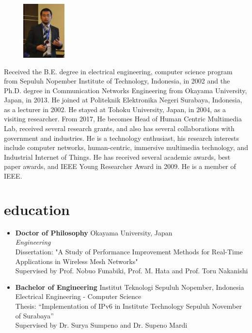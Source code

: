 \documentclass[]{friggeri-cv} %
\renewenvironment{entrylist}{%
  \begin{itemize}[leftmargin=1in]%
}{%
  \end{itemize}
}
\renewcommand{\entry}[4]{%
  \item[#1]
    \textbf{#2}%
    \hfill%
    {\footnotesize\addfontfeature{Color=lightgray} #3}\\%
    #4\vspace{\parsep}%
  }
\begin{document}
\begin{figure}
	\vspace{-10pt}
	\begin{center}
    \includegraphics[width=0.2\textwidth]{dhoto-jas.jpg}
    \end{center}
    
\end{figure}
Received the B.E. degree in electrical engineering, computer science program from Sepuluh Nopember Institute of Technology, Indonesia, in 2002 and the Ph.D. degree in Communication Networks Engineering from Okayama University, Japan, in 2013. He joined at Politeknik Elektronika Negeri Surabaya, Indonesia, as a lecturer in 2002. He stayed at Tohoku University, Japan, in 2004, as a visiting researcher. From 2017, He becomes Head of Human Centric Multimedia Lab, received several research grants, and also has several collaborations with government and industries. He is a technology enthusiast, his research interests include computer networks, human-centric, immersive multimedia technology, and Industrial Internet of Things. He has received several academic awards, best paper awards, and IEEE Young Researcher Award in 2009. He is a member of IEEE.



\section{education}

\begin{entrylist}

\entry
{2009--2013}
{Doctor {\normalfont of Philosophy}}
{Okayama University, Japan}
{\emph{Engineering} \\ 
Dissertation: "A Study of Performance Improvement Methods for Real-Time Applications in Wireless Mesh Networks" \\
Supervised by Prof. Nobuo Funabiki, Prof. M. Hata and Prof. Toru Nakanishi}

\entry
{1997--2002}
{Bachelor {\normalfont of Engineering}}
{Institut Teknologi Sepuluh Nopember, Indonesia}
{Electrical Engineering - Computer Science\\
Thesis: “Implementation of IPv6 in Institute Technology Sepuluh November of Surabaya” 
\\Supervised by Dr. Surya Sumpeno and Dr. Supeno Mardi
}

\end{entrylist}
\end{document}
